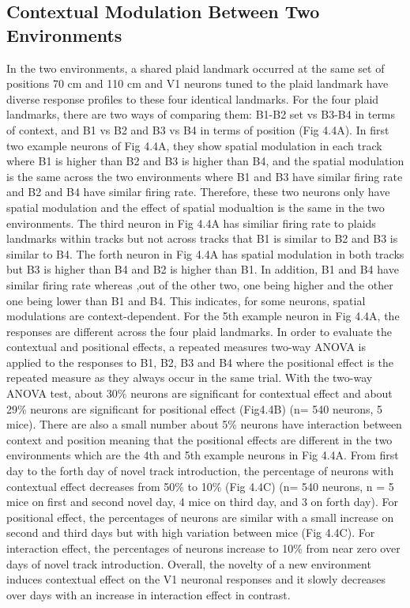 \subsection{Contextual Modulation Between Two Environments}
In the two environments, a shared plaid landmark occurred at the same set of positions 70 cm and 110 cm and V1 neurons tuned to the plaid landmark have diverse response profiles to these four identical landmarks. For the four plaid landmarks, there are two ways of comparing them: B1-B2 set vs B3-B4 in terms of context, and B1 vs B2 and B3 vs B4 in terms of position (Fig 4.4A).  In first two example neurons of Fig 4.4A, they show spatial modulation in each track where B1 is higher than B2 and B3 is higher than B4, and the spatial modulation is the same across the two environments where B1 and B3 have similar firing rate and B2 and B4 have similar firing rate. Therefore, these two neurons only have spatial modulation and the effect of spatial modualtion is the same in the two environments. The third neuron in Fig 4.4A has similiar firing rate to plaids landmarks within tracks but not across tracks that B1 is similar to B2 and B3 is similar to B4. The forth neuron in Fig 4.4A has spatial modulation in both tracks but B3 is higher than B4 and B2 is higher than B1. In addition, B1 and B4 have similar firing rate whereas ,out of the other two, one being higher and the other one being lower than B1 and B4. This indicates, for some neurons, spatial modulations are context-dependent. For the 5th example neuron in Fig 4.4A, the responses are different across the four plaid landmarks. In order to evaluate the contextual and positional effects, a repeated measures two-way ANOVA is applied to the responses to B1, B2, B3 and B4 where the positional effect is the repeated measure as they always occur in the same trial. With the two-way ANOVA test, about 30\% neurons are significant for contextual effect and about 29\% neurons are significant for positional effect (Fig4.4B) (n= 540 neurons, 5 mice). There are also a small number about 5\% neurons have interaction between context and position meaning that the positional effects are different in the two environments which are the 4th and 5th example neurons in Fig 4.4A. From first day to the forth day of novel track introduction, the percentage of neurons with contextual effect decreases from 50\% to 10\% (Fig 4.4C) (n= 540 neurons, n = 5 mice on first and second novel day, 4 mice on third day, and 3 on forth day). For positional effect, the percentages of neurons are similar with a small increase on second and third days but with high variation between mice (Fig 4.4C). For interaction effect, the percentages of neurons increase to 10\% from near zero over days of novel track introduction. Overall, the novelty of a new environment induces contextual effect on the V1 neuronal responses and it slowly decreases over days with an increase in interaction effect in contrast.





